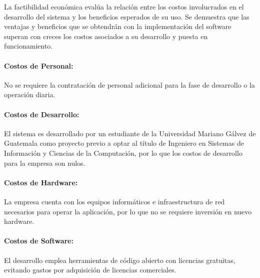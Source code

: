 La factibilidad económica evalúa la relación entre los costos involucrados en el desarrollo del sistema y los beneficios esperados de su uso. Se demuestra que las ventajas y beneficios que se obtendrán con la implementación del software superan con creces los costos asociados a su desarrollo y puesta en funcionamiento.


    \paragraph{Costos de Personal:} No se requiere la contratación de personal adicional para la fase de desarrollo o la operación diaria.
    \paragraph{Costos de Desarrollo:} El sistema es desarrollado por un estudiante de la Universidad Mariano Gálvez de Guatemala como proyecto previo a optar al título de Ingeniero en Sistemas de Información y Ciencias de la Computación, por lo que los costos de desarrollo para la empresa son nulos.
    \paragraph{Costos de Hardware:} La empresa cuenta con los equipos informáticos e infraestructura de red necesarios para operar la aplicación, por lo que no se requiere inversión en nuevo hardware.
    \paragraph{Costos de Software:} El desarrollo emplea herramientas de código abierto con licencias gratuitas, evitando gastos por adquisición de licencias comerciales.


